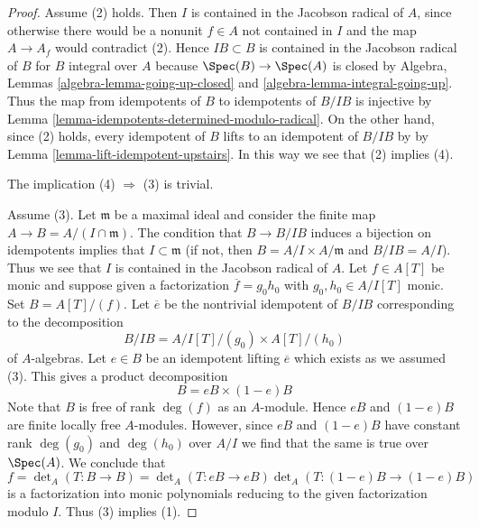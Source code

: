 \begin{proof}
Assume (2) holds. Then $I$ is contained in the Jacobson radical of $A$, since
otherwise there would be a nonunit $f \in A$ not contained in $I$
and the map $A \to A_f$ would contradict (2). Hence $IB \subset B$
is contained in the Jacobson radical of $B$ for $B$ integral over $A$
because $\Spec(B) \to \Spec(A)$ is closed by
Algebra, Lemmas \ref{algebra-lemma-going-up-closed} and
\ref{algebra-lemma-integral-going-up}.
Thus the map from idempotents of $B$ to idempotents of $B/IB$
is injective by Lemma \ref{lemma-idempotents-determined-modulo-radical}.
On the other hand, since (2) holds, every idempotent
of $B$ lifts to an idempotent of $B/IB$ by
by Lemma \ref{lemma-lift-idempotent-upstairs}.
In this way we see that (2) implies (4).

\medskip\noindent
The implication (4) $\Rightarrow$ (3) is trivial.

\medskip\noindent
Assume (3). Let $\mathfrak m$ be a maximal ideal and consider the
finite map $A \to B = A/(I \cap \mathfrak m)$. The condition that
$B \to B/IB$ induces a bijection on idempotents implies that
$I \subset \mathfrak m$ (if not, then $B = A/I \times A/\mathfrak m$
and $B/IB = A/I$). Thus we see that $I$ is contained in the Jacobson
radical of $A$. Let $f \in A[T]$ be monic and suppose given a
factorization $\overline{f} = g_0h_0$ with $g_0, h_0 \in A/I[T]$ monic.
Set $B = A[T]/(f)$. Let $\overline{e}$ be the nontrivial idempotent
of $B/IB$ corresponding to the decomposition
$$
B/IB = A/I[T]/(g_0) \times A[T]/(h_0)
$$
of $A$-algebras. Let $e \in B$ be an idempotent lifting $\overline{e}$
which exists as we assumed (3). This gives a product decomposition
$$
B = eB \times (1 - e)B
$$
Note that $B$ is free of rank $\deg(f)$ as an $A$-module.
Hence $eB$ and $(1 - e)B$ are finite locally free $A$-modules.
However, since $eB$ and $(1 - e)B$ have constant rank
$\deg(g_0)$ and $\deg(h_0)$ over $A/I$ we find that the same
is true over $\Spec(A)$. We conclude that
$$
f = \det\nolimits_A(T : B \to B) =
\det\nolimits_A(T : eB \to eB) \det\nolimits_A(T : (1 - e)B \to (1 - e)B)
$$
is a factorization into monic polynomials reducing to the given
factorization modulo $I$. Thus (3) implies (1).


\end{proof}
